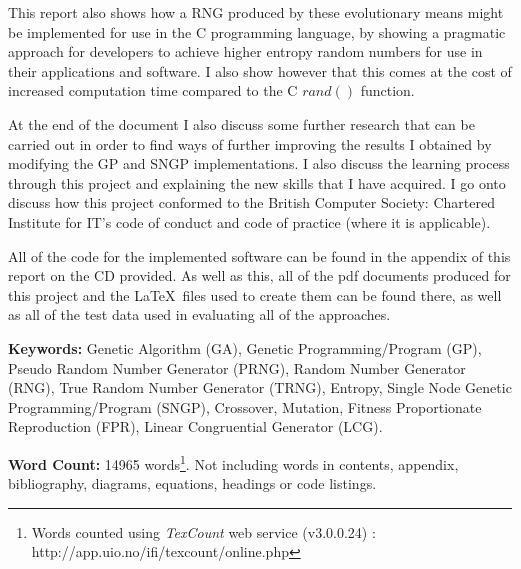 \documentclass[a4paper,10.5pt]{article}
\begin{document}
This report also shows how a RNG produced by these evolutionary means might be implemented for use in the C programming language, by showing a pragmatic approach for developers to achieve higher entropy random numbers for use in their applications and software. I also show however that this comes at the cost of increased computation time compared to the C $rand()$ function.

At the end of the document I also discuss some further research that can be carried out in order to find ways of further improving the results I obtained by modifying the GP and SNGP implementations. I also discuss the learning process through this project and explaining the new skills that I have acquired. I go onto discuss how this project conformed to the British Computer Society: Chartered Institute for IT's code of conduct and code of practice (where it is applicable).

All of the code for the implemented software can be found in the appendix of this report on the CD provided. As well as this, all of the pdf documents produced for this project and the \LaTeX\ files used to create them can be found there, as well as all of the test data used in evaluating all of the approaches.
\newline

\noindent \textbf{Keywords:} Genetic Algorithm (GA), Genetic Programming/Program (GP), Pseudo Random Number Generator (PRNG), Random Number Generator (RNG), True Random Number Generator (TRNG), Entropy, Single Node Genetic Programming/Program (SNGP), Crossover, Mutation, Fitness Proportionate Reproduction (FPR), Linear Congruential Generator (LCG).\newline

\noindent \textbf{Word Count:} 14965 words\footnote{Words counted using \emph{TexCount} web service (v3.0.0.24) : http://app.uio.no/ifi/texcount/online.php}. Not including words in contents, appendix, bibliography, diagrams, equations, headings or code listings.
\newpage

\newpage
\end{document}
